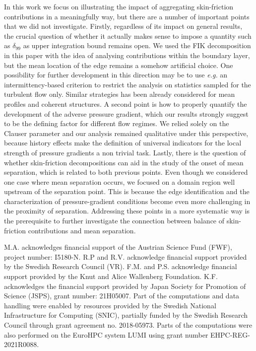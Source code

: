 In this work we focus on illustrating the impact of aggregating skin-friction contributions in a meaningfully way, but there are a number of important points that we did not investigate. Firstly, regardless of its impact on general results, the crucial question of whether it actually makes sense to impose a quantity such as $\delta_{99}$ as upper integration bound remains open. We used the FIK decomposition in this paper with the idea of analysing contributions within the boundary layer, but the mean location of the edge remains a somehow artificial choice. One possibility for further development in this direction may be to use \textit{e.g.\!} an intermittency-based criterion to restrict the analysis on statistics sampled for the turbulent flow only. Similar strategies has been already considered for mean profiles\cite{kwon16} and coherent structures\cite{hwan18,atzo20b}. A second point is how to properly quantify the development of the adverse pressure gradient, which our results strongly suggest to be the defining factor for different flow regimes. We relied solely on the Clauser parameter and our analysis remained qualitative under this perspective, because history effects make the definition of universal indicators for the local strength of pressure gradients a non trivial task. Lastly, there is the question of whether skin-friction decompositions can aid in the study of the onset of mean separation, which is related to both previous points. Even though we considered one case where mean separation occurs, we focused on a domain region well upstream of the separation point. This is because the edge identification and the characterization of pressure-gradient conditions become even more challenging in the proximity of separation. Addressing these points in a more systematic way is the prerequisite to further investigate the connection between balance of skin-friction contributions and mean separation.  

\begin{acknowledgments}
M.A. acknowledges financial support of the Austrian Science Fund (FWF), project number: I5180-N. R.P and R.V. acknowledge financial support provided by the Swedish Research Council (VR). F.M. and P.S. acknowledge financial support provided by the Knut and Alice Wallenberg Foundation. K.F. acknowledges the financial support provided by Japan Society for Promotion of Science (JSPS), grant number: 21H05007. Part of the computations and data handling were enabled by resources provided by the Swedish National Infrastructure for Computing (SNIC), partially funded by the Swedish Research Council through grant agreement no. 2018-05973. Parts of the computations were also performed on the EuroHPC system LUMI using grant number EHPC-REG-2021R0088.
\end{acknowledgments}

